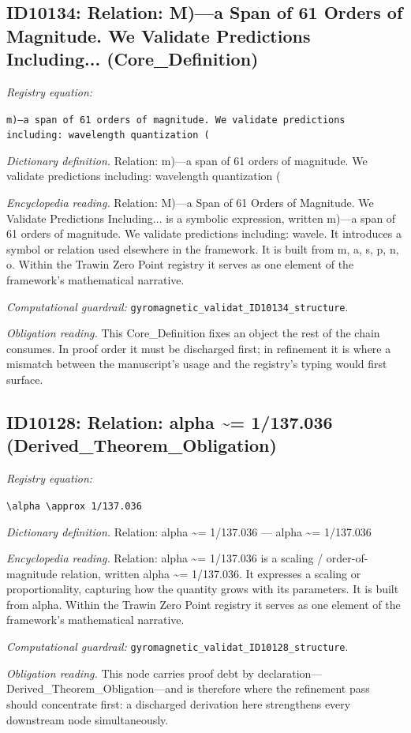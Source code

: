 \documentclass[11pt]{article}
\theoremstyle{remark}
\begin{document}
\subsection{ID10134: Relation: M)---a Span of 61 Orders of Magnitude. We Validate Predictions Including... (Core\_Definition)}

\noindent\textit{Registry equation:}\par
{\small\texttt{m)---a span of 61 orders of magnitude. We validate predictions including: wavelength quantization (}}\par\medskip
\noindent\textit{Dictionary definition.} Relation: m)---a span of 61 orders of magnitude. We validate predictions including: wavelength quantization (\par\medskip
\noindent\textit{Encyclopedia reading.} Relation: M)---a Span of 61 Orders of Magnitude. We Validate Predictions Including... is a symbolic expression, written m)---a span of 61 orders of magnitude. We validate predictions including: wavele. It introduces a symbol or relation used elsewhere in the framework. It is built from m, a, s, p, n, o. Within the Trawin Zero Point registry it serves as one element of the framework's mathematical narrative.
\par\medskip\noindent\textit{Computational guardrail:} \texttt{gyromagnetic\_validat\_ID10134\_structure}.
\par\medskip\noindent\textit{Obligation reading.} This Core\_Definition fixes an object the rest of the chain consumes. In proof order it must be discharged first; in refinement it is where a mismatch between the manuscript's usage and the registry's typing would first surface.

\subsection{ID10128: Relation: alpha \textasciitilde{}= 1/137.036 (Derived\_Theorem\_Obligation)}

\noindent\textit{Registry equation:}\par
{\small\texttt{\textbackslash{}alpha \textbackslash{}approx 1/137.036}}\par\medskip
\noindent\textit{Dictionary definition.} Relation: alpha \textasciitilde{}= 1/137.036 --- alpha \textasciitilde{}= 1/137.036\par\medskip
\noindent\textit{Encyclopedia reading.} Relation: alpha \textasciitilde{}= 1/137.036 is a scaling / order-of-magnitude relation, written alpha \textasciitilde{}= 1/137.036. It expresses a scaling or proportionality, capturing how the quantity grows with its parameters. It is built from alpha. Within the Trawin Zero Point registry it serves as one element of the framework's mathematical narrative.
\par\medskip\noindent\textit{Computational guardrail:} \texttt{gyromagnetic\_validat\_ID10128\_structure}.
\par\medskip\noindent\textit{Obligation reading.} This node carries proof debt by declaration---Derived\_Theorem\_Obligation---and is therefore where the refinement pass should concentrate first: a discharged derivation here strengthens every downstream node simultaneously.
\end{document}
